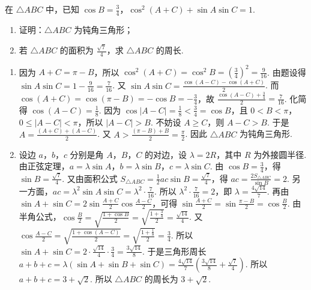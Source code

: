 \documentclass[UTF8,a4paper,oneside,11pt]{ctexbook}
\begin{document}
\begin{problem}
在 \(\triangle ABC\) 中，已知 \(\cos B=\frac{3}{4}\)，\(\cos^2\left( A+C \right)+\sin A\sin C=1\).

\begin{enumerate}
\item 证明：\(\triangle ABC\) 为钝角三角形；
\item 若 \(\triangle ABC\) 的面积为 \(\frac{\sqrt{7}}{4}\)，求 \(\triangle ABC\) 的周长.
\end{enumerate}
\end{problem}

\begin{solution}
\begin{enumerate}
\item 因为 \(A+C=\pi-B\)，所以 \(\cos^2\left( A+C \right)=\cos^2 B=\left( \frac{3}{4} \right)^2=\frac{9}{16}\). 由题设得 \(\sin A\sin C=1-\frac{9}{16}=\frac{7}{16}\).
又 \(\sin A\sin C=\frac{\cos\left( A-C \right)-\cos\left( A+C \right)}{2}\). 而 \(\cos\left( A+C \right)=\cos\left( \pi-B \right)=-\cos B=-\frac{3}{4}\)，故 \(\frac{\cos\left( A-C \right)+\frac{3}{4}}{2}=\frac{7}{16}\). 化简得 \(\cos\left( A-C \right)=\frac{1}{8}\).
因为 \(\cos\left| A-C \right|=\frac{1}{8}<\frac{3}{4}=\cos B\)，且 \(0<B<\pi\)，\(0\le \left| A-C \right|<\pi\)，所以 \(\left| A-C \right|>B\). 不妨设 \(A\ge C\)，则 \(A-C>B\). 于是 \(A=\frac{\left( A+C \right)+\left( A-C \right)}{2}\). 又 \(A>\frac{\left( \pi-B \right)+B}{2}=\frac{\pi}{2}\).
因此 \(\triangle ABC\) 为钝角三角形.

\item 设边 \(a\)，\(b\)，\(c\) 分别是角 \(A\)，\(B\)，\(C\) 的对边，设 \(\lambda=2R\)，其中 \(R\) 为外接圆半径. 由正弦定理，\(a=\lambda \sin A\)，\(b=\lambda \sin B\)，\(c=\lambda \sin C\).
由 \(\cos B=\frac{3}{4}\)，得 \(\sin B=\frac{\sqrt{7}}{4}\). 又由面积公式 \(S_{\triangle ABC}=\frac{1}{2}ac\sin B=\frac{\sqrt{7}}{4}\)，得 \(ac=\frac{2S_{\triangle ABC}}{\sin B}=2\). 另一方面，\(ac=\lambda^2\sin A\sin C=\lambda^2\cdot \frac{7}{16}\). 所以 \(\lambda^2\cdot \frac{7}{16}=2\)，即 \(\lambda=\frac{4\sqrt{14}}{7}\).
再由 \(\sin A+\sin C=2\sin \frac{A+C}{2}\cos \frac{A-C}{2}\)，可得 \(\sin \frac{A+C}{2}=\sin \frac{\pi-B}{2}=\cos \frac{B}{2}\). 由半角公式，\(\cos \frac{B}{2}=\sqrt{\frac{1+\cos B}{2}}=\sqrt{\frac{1+\frac{3}{4}}{2}}=\frac{\sqrt{14}}{4}\). 又 \(\cos \frac{A-C}{2}=\sqrt{\frac{1+\cos\left( A-C \right)}{2}}=\sqrt{\frac{1+\frac{1}{8}}{2}}=\frac{3}{4}\). 所以 \(\sin A+\sin C=2\cdot \frac{\sqrt{14}}{4}\cdot \frac{3}{4}=\frac{3\sqrt{14}}{8}\).
于是三角形周长 \(a+b+c=\lambda\left( \sin A+\sin B+\sin C \right)=\frac{4\sqrt{14}}{7}\left( \frac{3\sqrt{14}}{8}+\frac{\sqrt{7}}{4} \right)\). 所以 \(a+b+c=3+\sqrt{2}\).
所以 \(\triangle ABC\) 的周长为 \(3+\sqrt{2}\).
\end{enumerate}
\end{solution}
\end{document}
